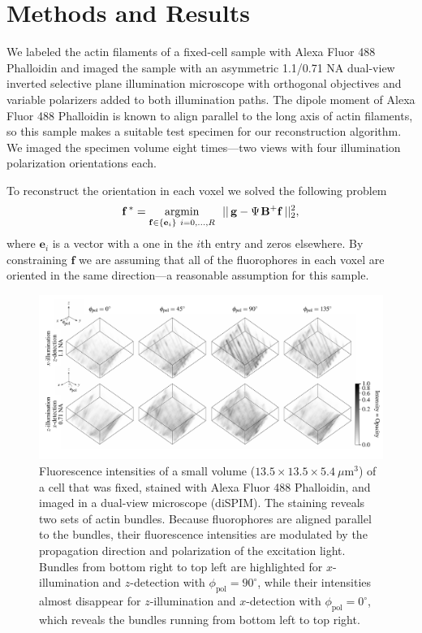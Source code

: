 \documentclass[letterpaper,10pt]{article}
\begin{document}
\section{Methods and Results}
We labeled the actin filaments of a fixed-cell sample with Alexa Fluor 488
Phalloidin and imaged the sample with an asymmetric 1.1/0.71 NA dual-view
inverted selective plane illumination microscope with orthogonal objectives
\cite{wu2017} and variable polarizers added to both illumination paths. The
dipole moment of Alexa Fluor 488 Phalloidin is known to align parallel to the
long axis of actin filaments, so this sample makes a suitable test specimen for
our reconstruction algorithm. We imaged the specimen volume eight times---two
views with four illumination polarization orientations each.

To reconstruct the orientation in each voxel we solved the following problem 
\begin{align}
\mathbf{f^{\thinspace *}}= \underset{\mathbf{f}\in\{\mathbf{e}_i\}\ i = 0,\dotsc,R}{\text{argmin}}
\ \ ||\thinspace\mathbf{g} - \Psi\hspace{0.1em}\mathbf{B}^+\mathbf{f}\thinspace||_2^2,
\end{align}
where $\mathbf{e}_i$ is a vector with a one in the $i$th entry and zeros
elsewhere. By constraining $\mathbf{f}$ we are assuming that all of the
fluorophores in each voxel are oriented in the same direction---a reasonable
assumption for this sample.
\begin{figure}[htbp]
  \centering
  \includegraphics[width=16.cm, trim={0.1cm 1.3cm 0 0.5cm}]{figs/roi2/data.pdf}
  \caption{Fluorescence intensities of a small volume
    ($13.5\times 13.5\times 5.4\ \mu$m${}^3$) of a cell that was fixed, stained
    with Alexa Fluor 488 Phalloidin, and imaged in a dual-view microscope
    (diSPIM). The staining reveals two sets of actin bundles. Because
    fluorophores are aligned parallel to the bundles, their fluorescence
    intensities are modulated by the propagation direction and polarization of
    the excitation light. Bundles from bottom right to top left are highlighted
    for $x$-illumination and $z$-detection with
    $\phi_{\text{pol}} = 90^{\circ}$, while their intensities almost disappear
    for $z$-illumination and $x$-detection with $\phi_{\text{pol}} = 0^{\circ}$,
    which reveals the bundles running from bottom left to top right.}
\end{figure}
\end{document}
